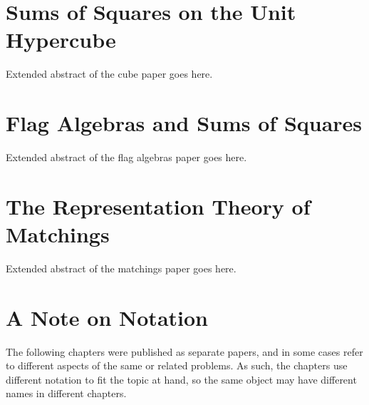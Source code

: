 \section{Sums of Squares on the Unit Hypercube}

Extended abstract of the cube paper goes here.

\section{Flag Algebras and Sums of Squares}

Extended abstract of the flag algebras paper goes here.

\section{The Representation Theory of Matchings}

Extended abstract of the matchings paper goes here.

\section{A Note on Notation}
The following chapters were published as separate papers, and in some cases
refer to different aspects of the same or related problems. As such, the 
chapters use different notation to fit the topic at hand, so the same object
may have different names in different chapters.
